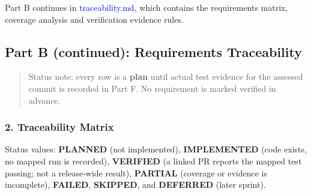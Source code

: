 \documentclass[12pt,a4paper]{article}
\begin{document}
Part B continues in \textcolor{blue}{traceability.md}, which contains the requirements matrix, coverage analysis and verification evidence rules.



\clearpage

\subsection*{Part B (continued): Requirements Traceability}

\begin{quote}
Status note: every row is a \textbf{plan} until actual test evidence for the assessed commit is recorded in Part F. No requirement is marked verified in advance.

\end{quote}

\subsubsection*{2. Traceability Matrix}
Status values: \textbf{PLANNED} (not implemented), \textbf{IMPLEMENTED} (code exists, no mapped run is recorded), \textbf{VERIFIED} (a linked PR reports the mapped test passing; not a release-wide result), \textbf{PARTIAL} (coverage or evidence is incomplete), \textbf{FAILED}, \textbf{SKIPPED}, and \textbf{DEFERRED} (later sprint).

\end{document}
